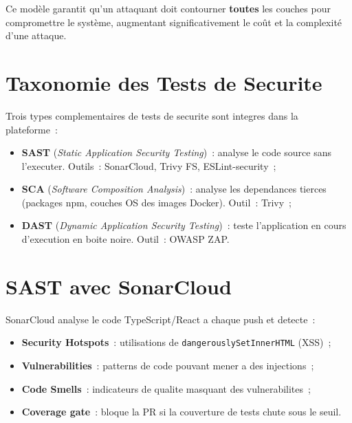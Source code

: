 Ce modèle garantit qu'un attaquant doit contourner \textbf{toutes} les couches pour
compromettre le système, augmentant significativement le coût et la complexité d'une attaque.

\section{Taxonomie des Tests de Securite}
Trois types complementaires de tests de securite sont integres dans la plateforme~:
\begin{itemize}
  \item \textbf{SAST} (\textit{Static Application Security Testing})~: analyse le code source
        sans l'executer. Outils~: SonarCloud, Trivy FS, ESLint-security~;
  \item \textbf{SCA} (\textit{Software Composition Analysis})~: analyse les dependances tierces
        (packages npm, couches OS des images Docker). Outil~: Trivy~;
  \item \textbf{DAST} (\textit{Dynamic Application Security Testing})~: teste l'application en
        cours d'execution en boite noire. Outil~: OWASP ZAP.
\end{itemize}
\section{SAST avec SonarCloud}
SonarCloud analyse le code TypeScript/React a chaque push et detecte~:
\begin{itemize}
  \item \textbf{Security Hotspots}~: utilisations de \texttt{dangerouslySetInnerHTML} (XSS)~;
  \item \textbf{Vulnerabilities}~: patterns de code pouvant mener a des injections~;
  \item \textbf{Code Smells}~: indicateurs de qualite masquant des vulnerabilites~;
  \item \textbf{Coverage gate}~: bloque la PR si la couverture de tests chute sous le seuil.
\end{itemize}

